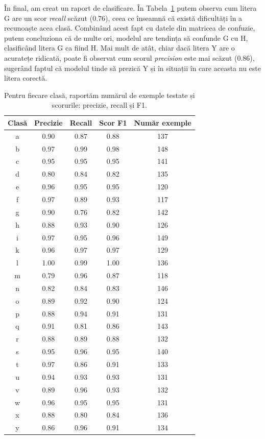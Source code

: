 În final, am creat un raport de clasificare. În Tabela~\ref{tab:classif_report} putem observa cum litera G are un scor \textit{recall} scăzut (0.76), ceea ce înseamnă că există dificultăți în a recunoaște acea clasă. Combinând acest fapt cu datele din matricea de confuzie, putem concluziona că de multe ori, modelul are tendința să confunde G cu H, clasificând litera G ca fiind H. Mai mult de atât, chiar dacă litera Y are o acuratețe ridicată, poate fi observat cum scorul \textit{precision} este mai scăzut (0.86), sugerând faptul că modelul tinde să prezică Y și în situații în care aceasta nu este litera corectă.

\begin{table}[H]
\centering
\scriptsize
\begin{tabular}{c c c c c}
\toprule
\textbf{Clasă} & \textbf{Precizie} & \textbf{Recall} & \textbf{Scor F1} & \textbf{Număr exemple} \\
\midrule
a & 0.90 & 0.87 & 0.88 & 137 \\
b & 0.97 & 0.99 & 0.98 & 148 \\
c & 0.95 & 0.95 & 0.95 & 141 \\
d & 0.80 & 0.84 & 0.82 & 135 \\
e & 0.96 & 0.95 & 0.95 & 120 \\
f & 0.97 & 0.89 & 0.93 & 117 \\
g & 0.90 & 0.76 & 0.82 & 142 \\
h & 0.88 & 0.93 & 0.90 & 126 \\
i & 0.97 & 0.95 & 0.96 & 149 \\
k & 0.96 & 0.97 & 0.97 & 129 \\
l & 1.00 & 0.99 & 1.00 & 136 \\
m & 0.79 & 0.96 & 0.87 & 118 \\
n & 0.82 & 0.84 & 0.83 & 146 \\
o & 0.89 & 0.92 & 0.90 & 124 \\
p & 0.88 & 0.94 & 0.91 & 131 \\
q & 0.91 & 0.81 & 0.86 & 143 \\
r & 0.88 & 0.89 & 0.88 & 132 \\
s & 0.95 & 0.96 & 0.95 & 140 \\
t & 0.97 & 0.86 & 0.91 & 133 \\
u & 0.94 & 0.93 & 0.93 & 131 \\
v & 0.89 & 0.96 & 0.93 & 132 \\
w & 0.96 & 0.95 & 0.95 & 131 \\
x & 0.88 & 0.80 & 0.84 & 136 \\
y & 0.86 & 0.96 & 0.91 & 134 \\
\bottomrule
\end{tabular}
\caption[Raport de clasificare]{Pentru fiecare clasă, raportăm numărul de exemple testate și scorurile: precizie, recall și F1.}
\label{tab:classif_report}
\end{table}


